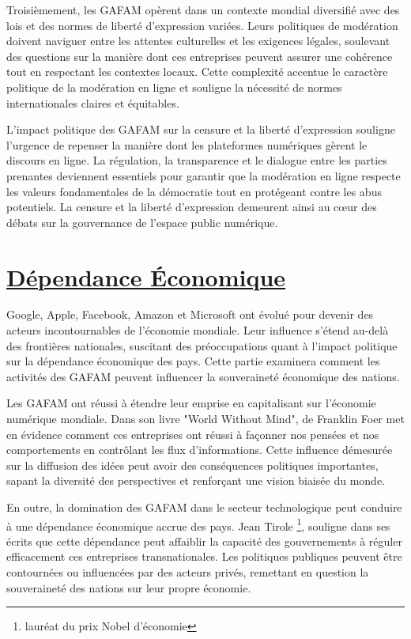 \documentclass[12pt,a4paper]{article} %
\begin{document}
	Troisièmement, les GAFAM opèrent dans un contexte mondial diversifié avec des lois et des normes de liberté d'expression variées. Leurs politiques de modération doivent naviguer entre les attentes culturelles et les exigences légales, soulevant des questions sur la manière dont ces entreprises peuvent assurer une cohérence tout en respectant les contextes locaux. Cette complexité accentue le caractère politique de la modération en ligne et souligne la nécessité de normes internationales claires et équitables.
	
	L'impact politique des GAFAM sur la censure et la liberté d'expression souligne l'urgence de repenser la manière dont les plateformes numériques gèrent le discours en ligne. La régulation, la transparence et le dialogue entre les parties prenantes deviennent essentiels pour garantir que la modération en ligne respecte les valeurs fondamentales de la démocratie tout en protégeant contre les abus potentiels. La censure et la liberté d'expression demeurent ainsi au cœur des débats sur la gouvernance de l'espace public numérique.
	
	\section{\underline{Dépendance Économique}}
	 
	 Google, Apple, Facebook, Amazon et Microsoft ont évolué pour devenir des acteurs incontournables de l'économie mondiale. Leur influence s'étend au-delà des frontières nationales, suscitant des préoccupations quant à l'impact politique sur la dépendance économique des pays. Cette partie examinera comment les activités des GAFAM peuvent influencer la souveraineté économique des nations.
	 
	 Les GAFAM ont réussi à étendre leur emprise en capitalisant sur l'économie numérique mondiale. Dans son livre "World Without Mind", de Franklin Foer \cite{Foer2018} met en évidence comment ces entreprises ont réussi à façonner nos pensées et nos comportements en contrôlant les flux d'informations. Cette influence démesurée sur la diffusion des idées peut avoir des conséquences politiques importantes, sapant la diversité des perspectives et renforçant une vision biaisée du monde.
	 
	 En outre, la domination des GAFAM dans le secteur technologique peut conduire à une dépendance économique accrue des pays. Jean Tirole \footnote[9]{lauréat du prix Nobel d'économie}, souligne dans ses écrits que cette dépendance peut affaiblir la capacité des gouvernements à réguler efficacement ces entreprises transnationales. Les politiques publiques peuvent être contournées ou influencées par des acteurs privés, remettant en question la souveraineté des nations sur leur propre économie.
	 
\end{document}

